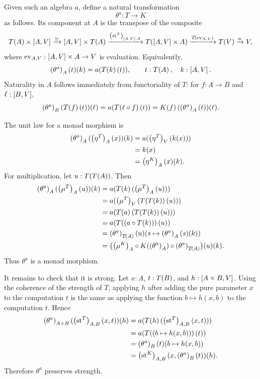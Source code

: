 \documentclass[11pt,a4paper]{article}
\theoremstyle{definition}
\theoremstyle{remark}
\providecommand{\str}{\operatorname{st}}
\begin{document}
Given such an algebra \(a\), define a natural transformation
\[
  \theta^{a}:T\to K
\]
as follows.  Its component at \(A\) is the transpose of the composite
\[
  \Fun{T}{A}\times\inthom{A}{V}
  \xrightarrow{\simeq}
  \inthom{A}{V}\times\Fun{T}{A}
  \xrightarrow{\Nat{\str^{T}}{\inthom{A}{V},A}}
  \Fun[np]{T}{\inthom{A}{V}\times A}
  \xrightarrow{\Fun{T}{\operatorname{ev}_{A,V}}}
  \Fun{T}{V}
  \xrightarrow{a}
  V,
\]
where
\(\operatorname{ev}_{A,V}:\left[A,V\right]\times A\to V\)
is evaluation.  Equivalently,
\[
  \Nat{\theta^{a}}{A}(t)(k)
  =
  a(\Fun{T}{k}(t)),
  \qquad
  t:\Fun{T}{A},
  \quad
  k:\inthom{A}{V}.
\]
Naturality in \(A\) follows immediately from functoriality of \(T\): for
\(f:A\to B\) and \(\ell:\left[B,V\right]\),
\[
  \Nat{\theta^{a}}{B}(\Fun{T}{f}(t))(\ell)
  =
  a(\Fun{T}{\ell\circ f}(t))
  =
  \Fun{K}{f}(\Nat{\theta^{a}}{A}(t))(\ell).
\]

The unit law for a monad morphism is
\[
\begin{aligned}
  \Nat{\theta^{a}}{A}(\Nat{\eta^{T}}{A}(x))(k)
  &=
  a(\Nat{\eta^{T}}{V}(k(x)))        \\
  &=
  k(x)                              \\
  &=
  \Nat{\eta^{K}}{A}(x)(k).
\end{aligned}
\]
For multiplication, let \(u:\Fun{T}{\Fun{T}{A}}\).  Then
\[
\begin{aligned}
  \Nat{\theta^{a}}{A}(\Nat{\mu^{T}}{A}(u))(k)
  &=
  a(\Fun{T}{k}(\Nat{\mu^{T}}{A}(u)))                                  \\
  &=
  a(\Nat{\mu^{T}}{V}(\Fun{T}{\Fun{T}{k}}(u)))                          \\
  &=
  a(\Fun{T}{a}(\Fun{T}{\Fun{T}{k}}(u)))                                \\
  &=
  a(\Fun{T}{(a\circ\Fun{T}{k})}(u))                                    \\
  &=
  \Nat{\theta^{a}}{\Fun{T}{A}}(u)
    (s\mapsto \Nat{\theta^{a}}{A}(s)(k))                               \\
  &=
  \bigl(
    \Nat{\mu^{K}}{A}
    \circ
    \Fun{K}{\Nat{\theta^{a}}{A}}
    \circ
    \Nat{\theta^{a}}{\Fun{T}{A}}
  \bigr)(u)(k).
\end{aligned}
\]
Thus \(\theta^{a}\) is a monad morphism.

It remains to check that it is strong.  Let
\(x:A\), \(t:\Fun{T}{B}\), and
\(h:\left[A\times B,V\right]\).  Using the coherence of the strength of \(T\),
applying \(h\) after adding the pure parameter \(x\) to the computation \(t\)
is the same as applying the function \(b\mapsto h(x,b)\) to the computation
\(t\).  Hence
\[
\begin{aligned}
  \Nat{\theta^{a}}{A\times B}
  (\Nat{\str^{T}}{A,B}(x,t))(h)
  &=
  a(\Fun{T}{h}(\Nat{\str^{T}}{A,B}(x,t)))       \\
  &=
  a(\Fun{T}{(b\mapsto h(x,b))}(t))              \\
  &=
  \Nat{\theta^{a}}{B}(t)(b\mapsto h(x,b))        \\
  &=
  \Nat{\str^{K}}{A,B}
  (x,\Nat{\theta^{a}}{B}(t))(h).
\end{aligned}
\]
Therefore \(\theta^{a}\) preserves strength.
\end{document}
